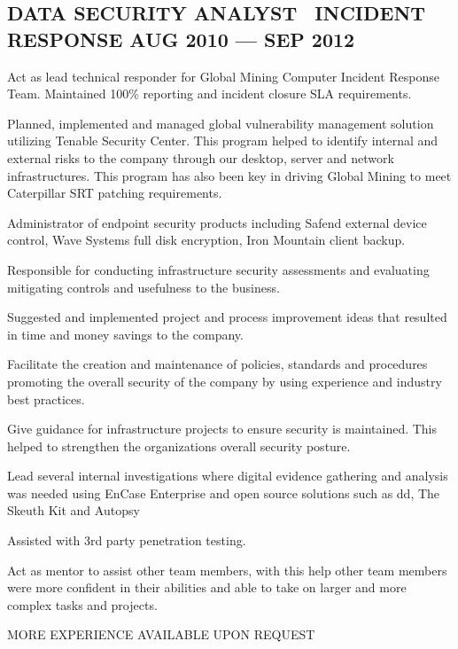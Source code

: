 \documentclass[letter,10pt]{article}
\begin{document}
\subsection{{DATA SECURITY ANALYST \ INCIDENT RESPONSE \hfill AUG 2010 --- SEP 2012}}
\begin{zitemize}
\item Act as lead technical responder for Global Mining Computer Incident Response Team. Maintained 100\% reporting and incident closure SLA requirements. 
\item Planned, implemented and managed global vulnerability management solution utilizing Tenable Security Center. This program helped to identify internal and external risks to the company through our desktop, server and network infrastructures. This program has also been key in driving Global Mining to meet Caterpillar SRT patching requirements. 
\item Administrator of endpoint security products including Safend external device control, Wave Systems full disk encryption, Iron Mountain client backup. 
\item Responsible for conducting infrastructure security assessments and evaluating mitigating controls and usefulness to the business. 
\item Suggested and implemented project and process improvement ideas that resulted in time and money savings to the company. 
\item Facilitate the creation and maintenance of policies, standards and procedures promoting the overall security of the company by using experience and industry best practices.  
\item Give guidance for infrastructure projects to ensure security is maintained. This helped to strengthen the organizations overall security posture. 
\item Lead several internal investigations where digital evidence gathering and analysis was needed using EnCase Enterprise and open source solutions such as dd, The Skeuth Kit and Autopsy
\item Assisted with 3rd party penetration testing. 
\item Act as mentor to assist other team members, with this help other team members were more confident in their abilities and able to take on larger and more complex tasks and projects. 
\end{zitemize}

MORE EXPERIENCE AVAILABLE UPON REQUEST
\end{document}
